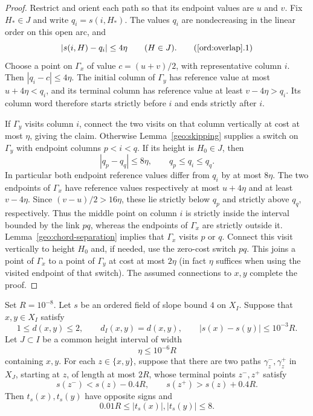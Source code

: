 \begin{proof}
Restrict and orient each path so that its endpoint values are
$u$ and $v$. Fix $H_*\in J$ and write $q_i=s(i,H_*)$.
The values $q_i$ are nondecreasing in the linear order on this
open arc, and
\[
 |s(i,H)-q_i|\le4\eta\qquad(H\in J).
\tag{\ref{ord:overlap}.1}\label{ord:profile-error}
\]
Choose a point on $\Gamma_x$ of value $c=(u+v)/2$, with
representative column $i$. Then $|q_i-c|\le4\eta$.
The initial column of $\Gamma_y$ has reference value at most
$u+4\eta<q_i$, and its terminal column has reference value
at least $v-4\eta>q_i$. Its column word therefore starts
strictly before $i$ and ends strictly after $i$.

If $\Gamma_y$ visits column $i$, connect the two visits on
that column vertically at cost at most $\eta$, giving the
claim. Otherwise Lemma~\ref{geo:skipping} supplies a switch
on $\Gamma_y$ with endpoint columns $p<i<q$. If its height
is $H_0\in J$, then
\[
 |q_p-q_q|\le8\eta,
 \qquad q_p\le q_i\le q_q.
\]
In particular both endpoint reference values differ from
$q_i$ by at most $8\eta$. The two endpoints of $\Gamma_x$
have reference values respectively at most $u+4\eta$ and
at least $v-4\eta$. Since $(v-u)/2>16\eta$, these lie
strictly below $q_p$ and strictly above $q_q$, respectively.
Thus the middle point on column $i$ is strictly inside the
interval bounded by the link $pq$, whereas the endpoints
of $\Gamma_x$ are strictly outside it.
Lemma~\ref{geo:chord-separation} implies that $\Gamma_x$
visits $p$ or $q$. Connect this visit vertically to height
$H_0$ and, if needed, use the zero-cost switch $pq$.
This joins a point of $\Gamma_x$ to a point of $\Gamma_y$
at cost at most $2\eta$ (in fact $\eta$ suffices when
using the visited endpoint of that switch). The assumed
connections to $x,y$ complete the proof.
\end{proof}

\begin{lemma}\label{ord:two-side}
Set $R=10^{-8}$. Let $s$ be an ordered field of slope bound
$4$ on $X_I$. Suppose that $x,y\in X_I$ satisfy
\[
 1\le d(x,y)\le2,\qquad d_I(x,y)=d(x,y),
 \qquad |s(x)-s(y)|\le10^{-3}R.
\]
Let $J\subset I$ be a common height interval of width
\[
 \eta\le10^{-6}R
\]
containing $x,y$. For each $z\in\{x,y\}$, suppose that
there are two paths $\gamma_z^-,\gamma_z^+$ in $X_J$,
starting at $z$, of length at most $2R$, whose terminal
points $z^-,z^+$ satisfy
\[
 s(z^-)<s(z)-0.4R,\qquad s(z^+)>s(z)+0.4R.
\]
Then $t_s(x),t_s(y)$ have opposite signs and
\[
 0.01R\le |t_s(x)|,|t_s(y)|\le8.
\]
\end{lemma}


